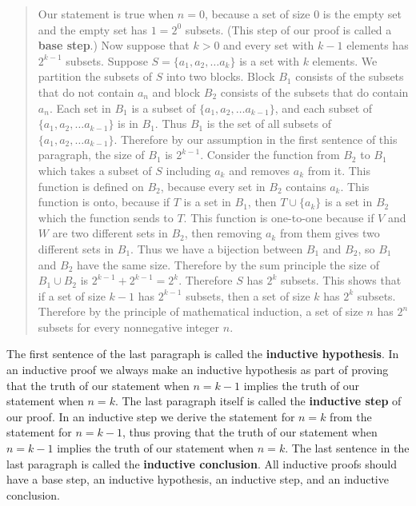 \documentclass[10pt,]{book}
\newcommand{\terminology}[1]{\textbf{#1}}
\theoremstyle{plain}
\theoremstyle{definition}
\theoremstyle{definition}
\numberwithin{equation}{chapter}
\begin{document}
\begin{quote}\hypertarget{blockquote-9}{}
\hypertarget{p-440}{}%
Our statement is true when \(n=0\), because a set of size 0 is the empty set and the empty set has \(1=2^0\) subsets. (This step of our proof is called a \terminology{base step}.) Now suppose that \(k>0\) and every set with \(k-1\) elements has \(2^{k-1}\) subsets.  Suppose \(S=\{a_1,a_2,\ldots a_k\}\) is a set with \(k\) elements. We partition the subsets of \(S\) into two blocks.  Block \(B_1\) consists of the subsets that do not contain \(a_n\) and block \(B_2\) consists of the subsets that do contain \(a_n\).  Each set in \(B_1\) is a subset of \(\{a_1,a_2,\ldots a_{k-1}\}\), and each subset of \(\{a_1,a_2, \ldots
a_{k-1}\}\) is in \(B_1\).  Thus \(B_1\) is the set of all subsets of \(\{a_1,a_2,\ldots a_{k-1}\}\).  Therefore by our assumption in the first sentence of this paragraph, the size of \(B_1\) is \(2^{k-1}\).  Consider the function from \(B_2\) to \(B_1\) which takes a subset of \(S\) including \(a_k\) and removes \(a_k\) from it.  This function is defined on \(B_2\), because every set in \(B_2\) contains \(a_k\).  This function is onto, because if \(T\) is a set in \(B_1\), then \(T\cup \{a_k\}\) is a set in \(B_2\) which the function sends to \(T\).  This function is one-to-one because if \(V\) and \(W\) are two different sets in \(B_2\), then removing \(a_k\) from them gives two different sets in \(B_1\).  Thus we have a bijection between \(B_1\) and \(B_2\), so \(B_1\) and \(B_2\) have the same size.  Therefore by the sum principle the size of \(B_1\cup B_2\) is \(2^{k-1} +2^{k-1}=2^k\).  Therefore \(S\) has \(2^k\) subsets.  This shows that if a set of size \(k-1\) has \(2^{k-1}\) subsets, then a set of size \(k\) has \(2^k\) subsets.  Therefore by the principle of mathematical induction, a set of size \(n\) has \(2^n\) subsets for every nonnegative integer \(n\).%
\end{quote}
\hypertarget{p-441}{}%
The first sentence of the last paragraph is called the \terminology{inductive hypothesis}. In an inductive proof we always make an inductive hypothesis as part of proving that the truth of our statement when \(n=k-1\) implies the truth of our statement when \(n=k\). The last paragraph itself is called the \terminology{inductive step} of our proof. In an inductive step we derive the statement for \(n=k\) from the statement for \(n=k-1\), thus proving that the truth of our statement when \(n=k-1\) implies the truth of our statement when \(n=k\). The last sentence in the last paragraph is called the \terminology{inductive conclusion}. All inductive proofs should have a base step, an inductive hypothesis, an inductive step, and an inductive conclusion.%
\end{document}
